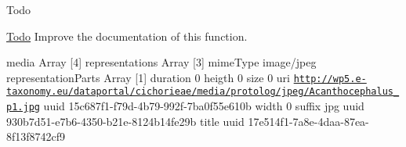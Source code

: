 \begin{DoxyRefDesc}{Todo}
\item[\hyperlink{todo__todo000057}{Todo}]Improve the documentation of this function.\end{DoxyRefDesc}


media Array \mbox{[}4\mbox{]} representations Array \mbox{[}3\mbox{]} mime\-Type image/jpeg representation\-Parts Array \mbox{[}1\mbox{]} duration 0 heigth 0 size 0 uri \href{http://wp5.e-taxonomy.eu/dataportal/cichorieae/media/protolog/jpeg/Acanthocephalus_p1.jpg}{\tt http\-://wp5.\-e-\/taxonomy.\-eu/dataportal/cichorieae/media/protolog/jpeg/\-Acanthocephalus\-\_\-p1.\-jpg} uuid 15c687f1-\/f79d-\/4b79-\/992f-\/7ba0f55e610b width 0 suffix jpg uuid 930b7d51-\/e7b6-\/4350-\/b21e-\/8124b14fe29b title uuid 17e514f1-\/7a8e-\/4daa-\/87ea-\/8f13f8742cf9


